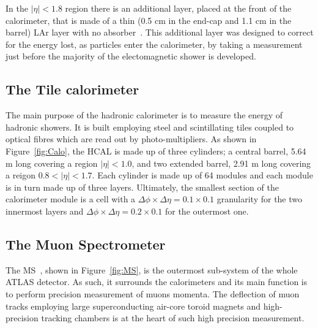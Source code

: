  				In the $\left | \eta\right | < 1.8$ region there is an additional layer, placed at the front of the calorimeter, that is made of a thin (0.5 cm in the end-cap and 1.1 cm in the barrel) LAr layer with no absorber~\cite{ATLASLAR}. This additional layer was designed to correct for the energy lost, as particles enter the calorimeter, by taking a measurement just before the majority of the electomagnetic shower is developed.


			\subsection*{The Tile calorimeter}

				The main purpose of the hadronic calorimeter is to measure the energy of hadronic showers. It is built employing steel and scintillating tiles coupled to optical fibres which are read out by photo-multipliers. As shown in Figure~\ref{fig:Calo}, the HCAL is made up of three cylinders; a central barrel, 5.64 m long covering a region $\left | \eta \right | < 1.0$, and two extended barrel, 2.91 m long covering a reigon $0.8 < \left | \eta \right | < 1.7$. Each cylinder is made up of 64 modules and each module is in turn made up of three layers. Ultimately, the smallest section of the calorimeter module is a cell with a $\Delta \phi \times \Delta \eta = 0.1 \times 0.1$ granularity for the two innermost layers and $\Delta \phi \times \Delta \eta = 0.2 \times 0.1$ for the outermost one. 

		\subsection{The Muon Spectrometer}
		\label{sec:MuSpec}

			The MS~\cite{MSTDR}, shown in Figure~\ref{fig:MS}, is the outermost sub-system of the whole ATLAS detector. As such, it surrounds the calorimeters and its main function is to perform precision measurement of muons momenta. The deflection of muon tracks employing large superconducting air-core toroid magnets and high-precision tracking chambers is at the heart of such high precision measurement. 

